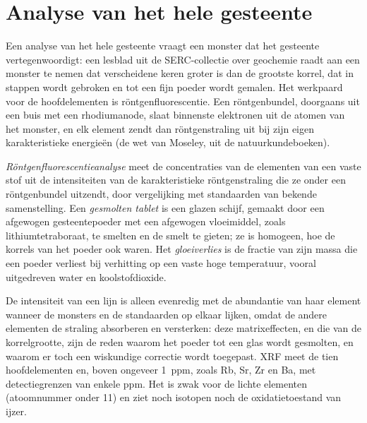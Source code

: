 
\section{Analyse van het hele gesteente}\label{sec:b2:field-lab-methods-2:whole-rock}

Een analyse van het hele gesteente vraagt een monster dat het gesteente vertegenwoordigt: een lesblad uit de SERC-collectie over
geochemie raadt aan een monster te nemen dat verscheidene keren groter is dan de grootste korrel,
dat in stappen wordt gebroken en tot een fijn poeder wordt gemalen. Het werkpaard voor de hoofdelementen is
röntgenfluorescentie. Een röntgenbundel, doorgaans uit een buis met een rhodiumanode, slaat binnenste
elektronen uit de atomen van het monster, en elk element zendt dan röntgenstraling uit bij zijn eigen
karakteristieke energieën (de wet van Moseley, uit de natuurkundeboeken).

\begin{definition}\label{def:b2:field-lab-methods-2:xrf}
\emph{Röntgenfluorescentieanalyse} meet de concentraties
van de elementen van een vaste stof uit de intensiteiten van de karakteristieke röntgenstraling die ze onder een
röntgenbundel uitzendt, door vergelijking met standaarden van bekende samenstelling. Een
\emph{gesmolten tablet} is een glazen schijf, gemaakt door een afgewogen gesteentepoeder met een afgewogen vloeimiddel,
zoals lithiumtetraboraat, te smelten en de smelt te gieten; ze is homogeen, hoe de korrels van het
poeder ook waren. Het \emph{gloeiverlies} is de fractie van zijn massa die
een poeder verliest bij verhitting op een vaste hoge temperatuur, vooral uitgedreven water en koolstofdioxide.
\end{definition}

De intensiteit van een lijn is alleen evenredig met de abundantie van haar element wanneer de monsters en
de standaarden op elkaar lijken, omdat de andere elementen de straling absorberen en versterken: deze
matrixeffecten, en die van de korrelgrootte, zijn de reden waarom het poeder tot een glas wordt gesmolten, en waarom er toch een wiskundige
correctie wordt toegepast. XRF meet de tien hoofdelementen en, boven ongeveer \qty{1}{ppm},
 zoals Rb, Sr, Zr en Ba, met detectiegrenzen van enkele ppm. Het is
zwak voor de lichte elementen (atoomnummer onder 11) en ziet noch isotopen noch de
oxidatietoestand van ijzer.

